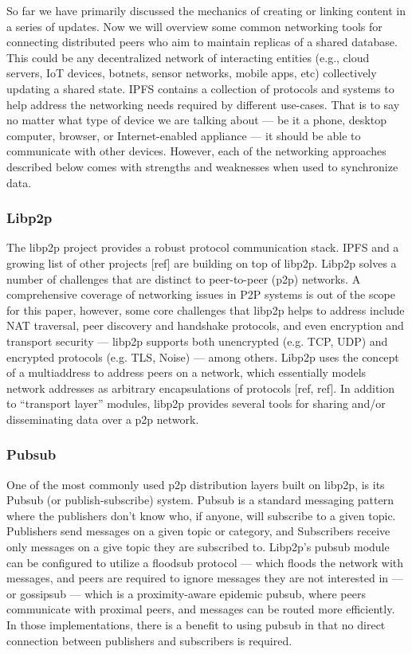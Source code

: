 \documentclass{comjnl}
\begin{document}
So far we have primarily discussed the mechanics of creating or linking content in a series of updates. Now we will overview some common networking tools for connecting distributed peers who aim to maintain replicas of a shared database. This could be any decentralized network of interacting entities (e.g., cloud servers, IoT devices, botnets, sensor networks, mobile apps, etc) collectively updating a shared state. IPFS contains a collection of protocols and systems to help address the networking needs required by different use-cases. That is to say no matter what type of device we are talking about — be it a phone, desktop computer, browser, or Internet-enabled appliance — it should be able to communicate with other devices. However, each of the networking approaches described below comes with strengths and weaknesses when used to synchronize data.

\subsubsection{Libp2p}

The libp2p project provides a robust protocol communication stack. IPFS and a growing list of other projects [ref] are building on top of libp2p. Libp2p solves a number of challenges that are distinct to peer-to-peer (p2p) networks. A comprehensive coverage of networking issues in P2P systems is out of the scope for this paper, however, some core challenges that libp2p helps to address include NAT traversal, peer discovery and handshake protocols, and even encryption and transport security — libp2p supports both unencrypted (e.g. TCP, UDP) and encrypted protocols (e.g. TLS, Noise) — among others. Libp2p uses the concept of a multiaddress to address peers on a network, which essentially models network addresses as arbitrary encapsulations of protocols [ref, ref]. In addition to “transport layer” modules, libp2p provides several tools for sharing and/or disseminating data over a p2p network.

\subsubsection{Pubsub}

One of the most commonly used p2p distribution layers built on libp2p, is its Pubsub (or publish-subscribe) system. Pubsub is a standard messaging pattern where the publishers don’t know who, if anyone, will subscribe to a given topic. Publishers send messages on a given topic or category, and Subscribers receive only messages on a give topic they are subscribed to. Libp2p’s pubsub module can be configured to utilize a floodsub protocol — which floods the network with messages, and peers are required to ignore messages they are not interested in — or gossipsub — which is a proximity-aware epidemic pubsub, where peers communicate with proximal peers, and messages can be routed more efficiently. In those implementations, there is a benefit to using pubsub in that no direct connection between publishers and subscribers is required.
\end{document}

